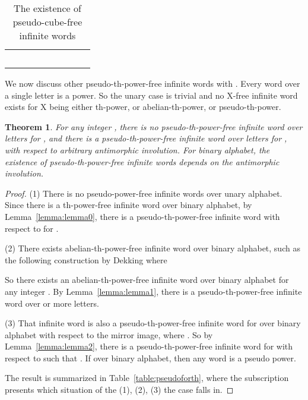 \documentclass[12pt]{article}
\newtheorem{theorem}{Theorem}
\begin{document}
\begin{table}
\centering \caption{The existence of pseudo-cube-free infinite
words}
\begin{tabular}{c|p{5.5ex}p{5.5ex}p{5.5ex}p{5.5ex}p{5.5ex}p{5.5ex}p{5.5ex}p{5.5ex}}
  \hline
 &  &  &  &  &  &  &  &  \\
  \hline
   &  &  &  &  &  &  &  &  \\
   &  &  &  &  &  &  &  &  \\
   &  &  &  &  &  &  &  &  \\
   &  &  &  &  &  &  &  &  \\
   &  &  &  &  &  &  &  &  \\
  \hline
\end{tabular}\label{table:pseudocube}
\end{table}


We now discuss other pseudo-th-power-free infinite words with
. Every word over a single letter is a power. So the unary
case is trivial and no X-free infinite word exists for X being
either th-power, or abelian-th-power, or pseudo-th-power.


\begin{theorem}
For any integer , there is no pseudo-th-power-free
infinite word over  letters for , and there is a
pseudo-th-power-free infinite word over  letters for , with respect to arbitrary antimorphic involution. For binary
alphabet, the existence of pseudo-th-power-free infinite words
depends on the antimorphic involution.
\end{theorem}
\begin{proof}
(1) There is no pseudo-power-free infinite words over unary
alphabet. Since there is a th-power-free infinite word over
binary alphabet, by Lemma~\ref{lemma:lemma0}, there is a
pseudo-th-power-free infinite word with respect to  for
.

(2) There exists abelian-th-power-free infinite word over binary
alphabet, such as the following construction by Dekking
\cite{Dekking1979}  where

So there exists an abelian-th-power-free infinite word  over
binary alphabet for any integer . By
Lemma~\ref{lemma:lemma1}, there is a pseudo-th-power-free
infinite word over  or more letters.

(3) That infinite word  is also a
pseudo-th-power-free infinite word for  over binary
alphabet with respect to the mirror image, where
. So by
Lemma~\ref{lemma:lemma2}, there is a pseudo-th-power-free
infinite word for  with respect to  such that
. If
 over binary alphabet, then any
word is a pseudo power.

The result is summarized in Table~\ref{table:pseudoforth}, where the
subscription presents which situation of the (1), (2), (3) the case
falls in.
\end{proof}
\end{document}
